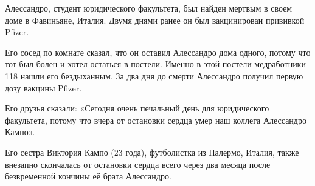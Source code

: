 Алессандро, студент юридического факультета, был найден мертвым в своем доме в
Фавиньяне, Италия. Двумя днями ранее он был вакцинирован прививкой Pfizer.

Его сосед по комнате сказал, что он оставил Алессандро дома одного, потому что
тот был болен и хотел остаться в постели. Именно в этой постели медработники 118
нашли его бездыханным. За два дня до смерти Алессандро получил первую дозу
вакцины Pfizer.

Его друзья сказали: «Сегодня очень печальный день для юридического факультета,
потому что вчера от остановки сердца умер наш коллега Алессандро Кампо».

Его сестра Виктория Кампо (23 года), футболистка из Палермо, Италия, также
внезапно скончалась от остановки сердца всего через два месяца после
безвременной кончины её брата Алессандро.
